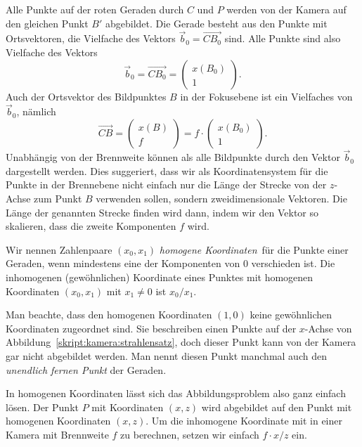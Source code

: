 Alle Punkte auf der roten Geraden durch $C$ und $P$ werden von der Kamera
auf den gleichen Punkt $B'$ abgebildet.
Die Gerade besteht aus den Punkte mit Ortsvektoren, die Vielfache des
Vektors $\vec{b}_0=\overrightarrow{CB_0}$ sind.
Alle Punkte sind also Vielfache des Vektors 
\[
\vec{b}_0
=
\overrightarrow{CB_0}
=
\begin{pmatrix}x(B_0)\\1\end{pmatrix}.
\]
Auch der Ortsvektor des Bildpunktes $B$ in der Fokusebene ist ein Vielfaches 
von $\vec{b}_0$, nämlich
\[
\overrightarrow{CB}
=
\begin{pmatrix}x(B)\\f\end{pmatrix}
=
f \cdot
\begin{pmatrix}x(B_0)\\1\end{pmatrix}.
\]
Unabhängig von der Brennweite können als alle Bildpunkte durch 
den Vektor $\vec{b}_0$ dargestellt werden.
Dies suggeriert, dass wir als Koordinatensystem für die Punkte in der
Brennebene nicht einfach nur die Länge der Strecke von der $z$-Achse 
zum Punkt $B$ verwenden sollen, sondern zweidimensionale Vektoren.
Die Länge der genannten Strecke finden wird dann, indem wir den Vektor
so skalieren, dass die zweite Komponenten $f$ wird.

\begin{definition}
Wir nennen Zahlenpaare $(x_0,x_1)$ {\em homogene Koordinaten} für die
Punkte einer Geraden, wenn mindestens eine der Komponenten von $0$
verschieden ist.
Die inhomogenen (gewöhnlichen) Koordinate eines Punktes mit
homogenen Koordinaten $(x_0,x_1)$ mit $x_1\ne 0$ ist $x_0/x_1$.
\end{definition}
%
Man beachte, dass den homogenen Koordinaten $(1,0)$ keine gewöhnlichen
Koordinaten zugeordnet sind.
Sie beschreiben einen Punkte auf der $x$-Achse von
Abbildung~\ref{skript:kamera:strahlensatz}, doch dieser Punkt kann
von der Kamera gar nicht abgebildet werden.
Man nennt diesen Punkt manchmal auch den {\em unendlich fernen Punkt} der
Geraden.
%

In homogenen Koordinaten lässt sich das Abbildungsproblem also ganz
einfach lösen. 
Der Punkt $P$ mit Koordinaten $(x,z)$ wird abgebildet auf den Punkt
mit homogenen Koordinaten $(x,z)$.
Um die inhomogene Koordinate mit in einer Kamera mit Brennweite $f$ zu
berechnen, setzen wir einfach $f\cdot x/z$ ein.

